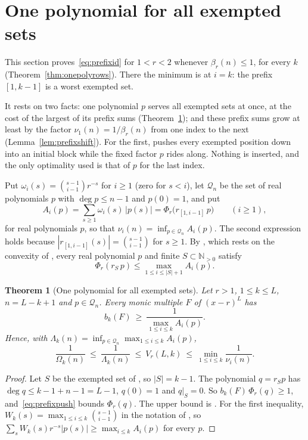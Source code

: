 \documentclass[11pt]{article}
\newtheorem{theorem}{Theorem}[section]
\newcommand{\N}{\mathbb N}
\begin{document}
\section{One polynomial for all exempted sets}\label{sec:onepoly}

This section proves~\eqref{eq:prefixid} for $1<r<2$ whenever $\beta_r(n)\le1$,
for every $k$ (Theorem~\ref{thm:onepolyrows}).  There the minimum is at
$i=k$: the prefix $[1,k-1]$ is a worst exempted set.

It rests on two facts: one polynomial $p$ serves all exempted sets at
once, at the cost of the largest of its prefix sums
(Theorem~\ref{thm:onepoly}); and these prefix sums grow at least by the
factor $\nu_1(n)=1/\beta_r(n)$ from one index to the next
(Lemma~\ref{lem:prefixshift}).  For the first,
\cite[Lemma~4.1(b)]{coefficient-mass-rows} pushes every exempted position down into an
initial block while the fixed factor $p$ rides along.  Nothing is inserted,
and the only optimality used is that of $p$ for the last index.

Put $\omega_i(s)=\binom{s-1}{i-1}r^{-s}$ for $i\ge1$ (zero for $s<i$),
let $\mathcal Q_n$ be the set of real polynomials $p$ with
$\deg p\le n-1$ and $p(0)=1$, and put
\[
  A_i(p)=\sum_{s\ge1}\omega_i(s)\,|p(s)|=\Phi_r\bigl(r_{[1,i-1]}\,p\bigr)
  \qquad(i\ge1),
\]
for real polynomials $p$, so that $\nu_i(n)=\inf_{p\in\mathcal Q_n}A_i(p)$.
The second expression holds because $|r_{[1,i-1]}(s)|=\binom{s-1}{i-1}$
for $s\ge1$.  
By \cite[Lemma~4.4]{coefficient-mass-rows}, which rests on the convexity
of \cite[Lemma~4.1(b)]{coefficient-mass-rows}, every real polynomial $p$
and finite $S\subset\N_{>0}$ satisfy
\begin{equation}\label{eq:prefixpush}
  \Phi_r(r_S\,p)\le\max_{1\le i\le|S|+1}A_i(p).
\end{equation}

\begin{theorem}[One polynomial for all exempted sets]\label{thm:onepoly}
Let $r>1$, $1\le k\le L$, $n=L-k+1$ and $p\in\mathcal Q_n$.  Every monic
multiple $F$ of $(x-r)^L$ has
\[
  b_k(F)\ \ge\ \frac1{\max_{1\le i\le k}A_i(p)} .
\]
Hence, with $\Lambda_k(n)=\inf_{p\in\mathcal Q_n}\max_{1\le i\le k}A_i(p)$,
\[
  \frac1{\Omega_k(n)}\ \le\ \frac1{\Lambda_k(n)}\ \le\ V_r(L,k)\ \le\
  \min_{1\le i\le k}\frac1{\nu_i(n)} .
\]
\end{theorem}

\begin{proof}
Let $S$ be the exempted set of \cite[Proposition~2.1(a)]{coefficient-mass-rows}, so
$|S|=k-1$.  The polynomial $q=r_Sp$ has $\deg q\le k-1+n-1=L-1$, $q(0)=1$
and $q|_S=0$.  So $b_k(F)\,\Phi_r(q)\ge1$, and~\eqref{eq:prefixpush}
bounds $\Phi_r(q)$.  The upper bound is \cite[Theorem~3.3]{coefficient-mass-rows}.  For
the first inequality, $W_k(s)=\max_{1\le i\le k}\binom{s-1}{i-1}$ in the
notation of \cite[Theorem~3.3]{coefficient-mass-rows}, so
$\sum_sW_k(s)r^{-s}|p(s)|\ge\max_{i\le k}A_i(p)$ for every $p$.
\end{proof}
\end{document}
